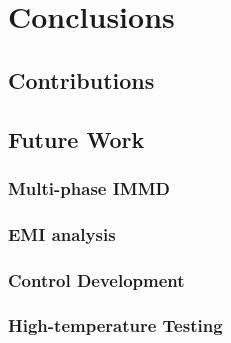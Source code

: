 \chapter{Conclusions}

\section{Contributions}

\section{Future Work}

\subsection{Multi-phase IMMD}

\subsection{EMI analysis}

\subsection{Control Development}

\subsection{High-temperature Testing}
